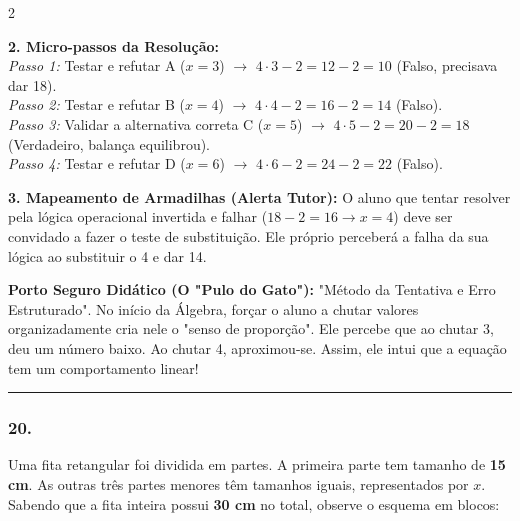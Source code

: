 \begin{multicols*}{2}
\begin{tcolorbox}[colback=CorTitUm!5, colframe=CorTitUm, boxrule=1pt, arc=4pt, left=6pt, right=6pt, top=6pt, bottom=6pt]
    \textbf{2. Micro-passos da Resolução:}\\
    \textit{Passo 1:} Testar e refutar A ($x=3$) $\rightarrow$ $ 4 \cdot 3 - 2 = 12 - 2 = 10 $ (Falso, precisava dar 18).\\
    \textit{Passo 2:} Testar e refutar B ($x=4$) $\rightarrow$ $ 4 \cdot 4 - 2 = 16 - 2 = 14 $ (Falso).\\
    \textit{Passo 3:} Validar a alternativa correta C ($x=5$) $\rightarrow$ $ 4 \cdot 5 - 2 = 20 - 2 = 18 $ (Verdadeiro, balança equilibrou).\\
    \textit{Passo 4:} Testar e refutar D ($x=6$) $\rightarrow$ $ 4 \cdot 6 - 2 = 24 - 2 = 22 $ (Falso).\par\vspace{0.1cm}
    
    \textbf{3. Mapeamento de Armadilhas (Alerta Tutor):} O aluno que tentar resolver pela lógica operacional invertida e falhar ($18-2=16 \rightarrow x=4$) deve ser convidado a fazer o teste de substituição. Ele próprio perceberá a falha da sua lógica ao substituir o 4 e dar 14.
    \end{tcolorbox}
    \vspace{0.15cm}
    
    \begin{boxexplicacao}
    \textbf{Porto Seguro Didático (O "Pulo do Gato"):} "Método da Tentativa e Erro Estruturado". No início da Álgebra, forçar o aluno a chutar valores organizadamente cria nele o "senso de proporção". Ele percebe que ao chutar 3, deu um número baixo. Ao chutar 4, aproximou-se. Assim, ele intui que a equação tem um comportamento linear!
    \end{boxexplicacao}
\fi

\par\vspace{\espacoQuestao}

\noindent\textcolor{CorLinha}{\rule{\linewidth}{0.5pt}} 
\par\vspace{\espacoPreQuestao}
\subsubsection*{20.} 
\begin{enunciadoLiteral}
Uma fita retangular foi dividida em partes. A primeira parte tem tamanho de \textbf{15 cm}. As outras três partes menores têm tamanhos iguais, representados por $x$. Sabendo que a fita inteira possui \textbf{30 cm} no total, observe o esquema em blocos:


\end{enunciadoLiteral}
\end{multicols*}
